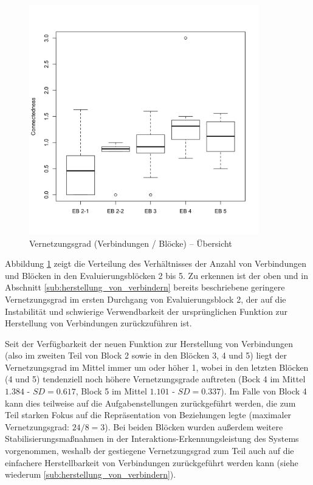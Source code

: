 \begin{figure}[htbp]
	\centering
		\includegraphics[width=10cm]{img/Evaluierung/connectednessOverviewAll.png}
	\caption{Vernetzungsgrad (Verbindungen / Blöcke) -- Übersicht}
	\label{fig:img_Evaluierung_connectednessOverviewAll}
\end{figure}

Abbildung \ref{fig:img_Evaluierung_connectednessOverviewAll} zeigt die Verteilung des Verhältnisses der Anzahl von Verbindungen und Blöcken in den Evaluierungsblöcken 2 bis 5. Zu erkennen ist der oben und in Abschnitt \ref{sub:herstellung_von_verbindern} bereits beschriebene geringere Vernetzungsgrad im ersten Durchgang von Evaluierungsblock 2, der auf die Instabilität und schwierige Verwendbarkeit der ursprünglichen Funktion zur Herstellung von Verbindungen zurückzuführen ist.

Seit der Verfügbarkeit der neuen Funktion zur Herstellung von Verbindungen (also im zweiten Teil von Block 2 sowie in den Blöcken 3, 4 und 5) liegt der Vernetzungsgrad im Mittel immer um oder höher 1, wobei in den letzten Blöcken (4 und 5) tendenziell noch höhere Vernetzungsgrade auftreten (Bock 4 im Mittel $1.384$ - $SD=0.617$, Block 5 im Mittel $1.101$ - $SD=0.337$). Im Falle von Block 4 kann dies teilweise auf die Aufgabenstellungen zurückgeführt werden, die zum Teil starken Fokus auf die Repräsentation von Beziehungen legte (maximaler Vernetzungsgrad: $24/8=3$). Bei beiden Blöcken wurden außerdem weitere Stabilisierungsmaßnahmen in der Interaktions-Erkennungsleistung des Systems vorgenommen, weshalb der gestiegene Vernetzungsgrad zum Teil auch auf die einfachere Herstellbarkeit von Verbindungen zurückgeführt werden kann (siehe wiederum \ref{sub:herstellung_von_verbindern}).

